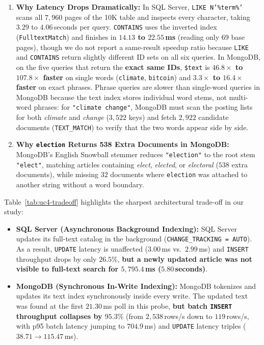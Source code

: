 \begin{enumerate}
\item \textbf{Why Latency Drops Dramatically:} In SQL Server, \texttt{LIKE N'\%term\%'} scans all $7,960$ pages of the 10K table and inspects every character, taking $3.29$ to $4.06$\,seconds per query. \texttt{CONTAINS} uses the inverted index (\texttt{FulltextMatch}) and finishes in \textbf{$14.13$ to $22.55$\,ms} (reading only $69$ base pages), though we do not report a same-result speedup ratio because \texttt{LIKE} and \texttt{CONTAINS} return slightly different ID sets on all six queries. In MongoDB, on the five queries that return the \textbf{exact same IDs}, \texttt{\$text} is \textbf{$46.8\times$ to $107.8\times$ faster} on single words (\texttt{climate}, \texttt{bitcoin}) and \textbf{$3.3\times$ to $16.4\times$ faster} on exact phrases. Phrase queries are slower than single-word queries in MongoDB because the text index stores individual word stems, not multi-word phrases: for \texttt{"climate change"}, MongoDB must scan the posting lists for both \emph{climate} and \emph{change} ($3,522$ keys) and fetch $2,922$ candidate documents (\texttt{TEXT\_MATCH}) to verify that the two words appear side by side.
\item \textbf{Why \texttt{election} Returns 538 Extra Documents in MongoDB:} MongoDB's English Snowball stemmer reduces \texttt{"election"} to the root stem \texttt{"elect"}, matching articles containing \emph{elect}, \emph{elected}, or \emph{electoral} ($538$ extra documents), while missing $32$ documents where \texttt{election} was attached to another string without a word boundary.
\end{enumerate}

Table~\ref{tab:uc4-tradeoff} highlights the sharpest architectural trade-off in our study:
\begin{itemize}
\item \textbf{SQL Server (Asynchronous Background Indexing):} SQL Server updates its full-text catalog in the background (\texttt{CHANGE\_TRACKING = AUTO}). As a result, \texttt{UPDATE} latency is unaffected ($3.00$\,ms vs.\ $2.99$\,ms) and \texttt{INSERT} throughput drops by only $26.5\%$, \textbf{but a newly updated article was not visible to full-text search for $5,795.4$\,ms ($5.80$\,seconds)}.
\item \textbf{MongoDB (Synchronous In-Write Indexing):} MongoDB tokenizes and updates its text index synchronously inside every write. The updated text was found at the first $21.30$\,ms poll in this probe, \textbf{but batch \texttt{INSERT} throughput collapses by $95.3\%$} (from $2,538$\,rows/s down to $119$\,rows/s, with p95 batch latency jumping to $704.9$\,ms) and \texttt{UPDATE} latency triples ($38.71 \rightarrow 115.47$\,ms).
\end{itemize}

